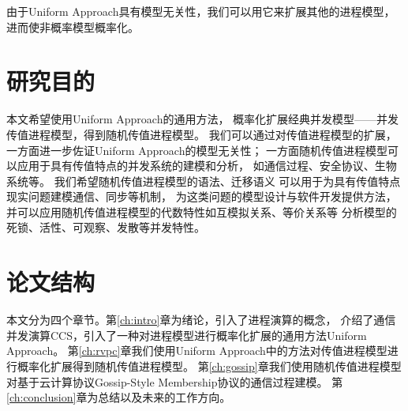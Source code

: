    由于Uniform Approach具有模型无关性，我们可以用它来扩展其他的进程模型，
   进而使非概率模型概率化。

\section{研究目的}
本文希望使用Uniform Approach的通用方法，
概率化扩展经典并发模型——并发传值进程模型，得到随机传值进程模型。
我们可以通过对传值进程模型的扩展，
一方面进一步佐证Uniform Approach的模型无关性；
一方面随机传值进程模型可以应用于具有传值特点的并发系统的建模和分析，
如通信过程、安全协议、生物系统等。
我们希望随机传值进程模型的语法、迁移语义
可以用于为具有传值特点现实问题建模通信、同步等机制，
为这类问题的模型设计与软件开发提供方法，
并可以应用随机传值进程模型的代数特性如互模拟关系、等价关系等
分析模型的死锁、活性、可观察、发散等并发特性。

\section{论文结构}
本文分为四个章节。第\ref{ch:intro}章为绪论，引入了进程演算的概念，
介绍了通信并发演算CCS，引入了一种对进程模型进行概率化扩展的通用方法Uniform Approach。
第\ref{ch:rvpc}章我们使用Uniform Approach中的方法对传值进程模型进行概率化扩展得到随机传值进程模型。
第\ref{ch:gossip}章我们使用随机传值进程模型对基于云计算协议Gossip-Style Membership协议的通信过程建模。
第\ref{ch:conclusion}章为总结以及未来的工作方向。
